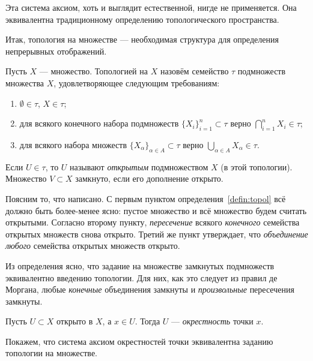 Эта система аксиом, хоть и выглядит естественной, нигде не применяется. Она эквивалентна традиционному определению топологического пространства.

Итак, топология на множестве --- необходимая структура для определения непрерывных отображений.
\begin{defin}\label{defin:topol}
	Пусть $X$ --- множество. Топологией на $X$ назовём семейство $\tau$ подмножеств множества $X$, удовлетворяющее следующим требованиям:
	\begin{enumerate}
		\item $\emptyset\in\tau$, $X\in\tau$;
		\item для всякого конечного набора подмножеств $\{X_i\}_{i=1}^n\subset\tau$ верно $\bigcap\limits_{i=1}^n X_i\in\tau$;
		\item для всякого набора множеств $\{X_{\alpha}\}_{\alpha\in A}\subset\tau$ верно $\bigcup\limits_{\alpha\in A} X_{\alpha}\in\tau$.
	\end{enumerate}
	Если $U\in\tau$, то $U$ называют \textit{открытым} подмножеством $X$ (в этой топологии). Множество $V\subset X$ замкнуто, если его дополнение открыто.
\end{defin}
Поясним то, что написано. С первым пунктом определения~\ref{defin:topol} всё должно быть более-менее ясно: пустое множество и всё множество будем считать открытыми. Согласно второму пункту, \textit{пересечение} всякого \textit{конечного} семейства открытых множеств снова открыто. Третий же пункт утверждает, что \textit{объединение} \textit{любого} семейства открытых множеств открыто.

Из определения ясно, что задание на множестве замкнутых подмножеств эквивалентно введению топологии. Для них, как это следует из правил де Моргана, любые \textit{конечные} объединения замкнуты и \textit{произвольные} пересечения замкнуты.
\begin{defin}
	Пусть $U\subset X$ открыто в $X$, а $x\in U$. Тогда $U$ --- \textit{окрестность} точки $x$.
\end{defin}

Покажем, что система аксиом окрестностей точки эквивалентна заданию топологии на множестве. 

